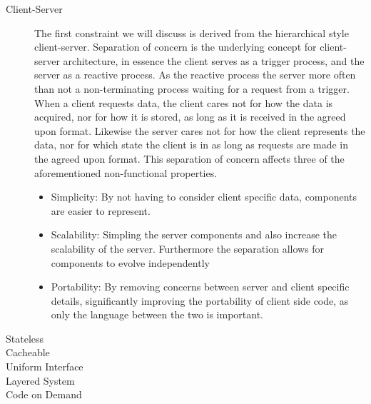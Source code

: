 \begin{description}
    \item [Client-Server] The first constraint we will discuss is derived from the hierarchical style client-server.
    Separation of concern is the underlying concept for client-server architecture, in essence the client serves as a trigger process, and the server as a reactive process.
    As the reactive process the server more often than not a non-terminating process waiting for a request from a trigger.
    When a client requests data, the client cares not for how the data is acquired, nor for how it is stored, as long as it is received in the agreed upon format.
    Likewise the server cares not for how the client represents the data, nor for which state the client is in as long as requests are made in the agreed upon format.
    This separation of concern affects three of the aforementioned non-functional properties.
    \begin{itemize}
        \item Simplicity: By not having to consider client specific data, components are easier to represent.
        \item Scalability: Simpling the server components and also increase the scalability of the server. Furthermore the separation allows for components to evolve independently
        \item Portability: By removing concerns between server and client specific details, significantly improving the portability of client side code, as only the language between the two is important.
    \end{itemize}
    \item [Stateless] 
    \item [Cacheable] 
    \item [Uniform Interface] 
    \item [Layered System] 
    \item [Code on Demand]  
\end{description}